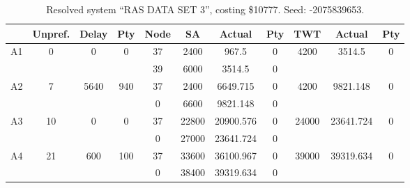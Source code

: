 \begin{sidewaystable}
\footnotesize
\caption{Resolved system ``RAS DATA SET 3'', costing \$10777. Seed: -2075839653.}
\centering
\begin{tabular}{c||c|c|c||c|c|c|c||c|c|c}
  \hline \hline
  &
  Unpref. & 
  Delay &
  Pty &
  Node &
  SA &
  Actual &
  Pty &
  TWT &
  Actual &
  Pty \\
      \hline
      \multirow{2}{*}{A1} &
      \multirow{2}{*}{0} &
      \multirow{2}{*}{0} &
      \multirow{2}{*}{0} &
      37 &
      2400 &
        967.5 &
        0 &
      \multirow{2}{*}{4200} &
        \multirow{2}{*}{3514.5} &
        \multirow{2}{*}{0}
      \\
      \cline{5-8}
       &
       &
       &
       &
      39 &
      6000 &
        3514.5 &
        0 &
      
         &
        
      \\
      \hline
      \multirow{2}{*}{A2} &
      \multirow{2}{*}{7} &
      \multirow{2}{*}{5640} &
      \multirow{2}{*}{940} &
      37 &
      2400 &
        6649.715 &
        0 &
      \multirow{2}{*}{4200} &
        \multirow{2}{*}{9821.148} &
        \multirow{2}{*}{0}
      \\
      \cline{5-8}
       &
       &
       &
       &
      0 &
      6600 &
        9821.148 &
        0 &
      
         &
        
      \\
      \hline
      \multirow{2}{*}{A3} &
      \multirow{2}{*}{10} &
      \multirow{2}{*}{0} &
      \multirow{2}{*}{0} &
      37 &
      22800 &
        20900.576 &
        0 &
      \multirow{2}{*}{24000} &
        \multirow{2}{*}{23641.724} &
        \multirow{2}{*}{0}
      \\
      \cline{5-8}
       &
       &
       &
       &
      0 &
      27000 &
        23641.724 &
        0 &
      
         &
        
      \\
      \hline
      \multirow{2}{*}{A4} &
      \multirow{2}{*}{21} &
      \multirow{2}{*}{600} &
      \multirow{2}{*}{100} &
      37 &
      33600 &
        36100.967 &
        0 &
      \multirow{2}{*}{39000} &
        \multirow{2}{*}{39319.634} &
        \multirow{2}{*}{0}
      \\
      \cline{5-8}
       &
       &
       &
       &
      0 &
      38400 &
        39319.634 &
        0 &
      

\end{tabular}
\end{sidewaystable}

